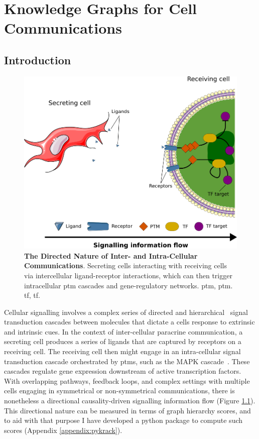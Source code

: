 \chapter{Knowledge Graphs for Cell Communications}
\label{06kg}

\newpage
\section{Introduction}

\begin{figure}
    \centering
    \includegraphics{06kg/figs/6KG_com.png}
    \caption{\textbf{The Directed Nature of Inter- and Intra-Cellular Communications}. Secreting cells interacting with receiving cells via intercellular ligand-receptor interactions, which can then trigger intracellular \acrshort{ptm} cascades and gene-regulatory networks. \acrshort{ptm}, \acrlong{ptm}. \acrshort{tf}, \acrlong{tf}.}
    \label{fig:6intro}
\end{figure}

Cellular signalling involves a complex series of directed and hierarchical~\cite{kumar_3_2003} signal transduction cascades between molecules that dictate a cells response to extrinsic and intrinsic cues. In the context of inter-cellular paracrine communication, a secreting cell produces a series of ligands that are captured by receptors on a receiving cell. The receiving cell then might engage in an intra-cellular signal transduction cascade orchestrated by \acrshort{ptm}s, such as the MAPK cascade~\cite{zhang_mapk_2002}. These cascades regulate gene expression downstream of active transcription factors. With overlapping pathways, feedback loops, and complex settings with multiple cells engaging in symmetrical or non-symmetrical communications, there is nonetheless a directional causality-driven signalling information flow (Figure \ref{fig:6intro}). This directional nature can be measured in terms of graph hierarchy scores, and to aid with that purpose I have developed a python package to compute such scores (Appendix \ref{appendix:pykrack}).

